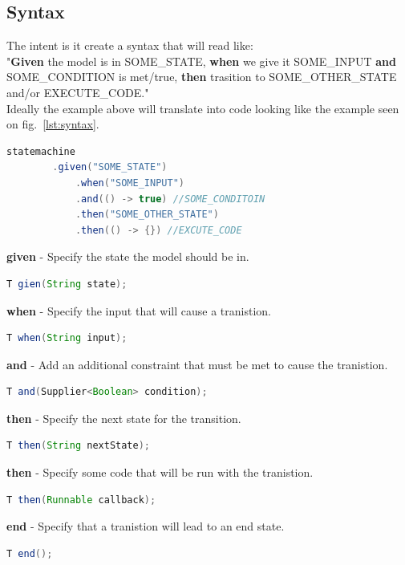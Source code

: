 \documentclass{article}
\begin{document}
\subsection{Syntax}

The intent is it create a syntax that will read like:\\
"\textbf{Given} the model is in SOME\_STATE, \textbf{when} we give it SOME\_INPUT \textbf{and} SOME\_CONDITION is met/true, \textbf{then} trasition to SOME\_OTHER\_STATE  and/or EXECUTE\_CODE."\\

\noindent Ideally the example above will translate into code looking like the example seen on fig.~\ref{lst:syntax}.
\begin{lstlisting}[language=java, caption={Example of Intented API Usage}, captionpos=b, label={lst:syntax}]
    statemachine
        .given("SOME_STATE")
            .when("SOME_INPUT")
            .and(() -> true) //SOME_CONDITOIN
            .then("SOME_OTHER_STATE")
            .then(() -> {}) //EXCUTE_CODE
\end{lstlisting}

\textbf{given} - Specify the state the model should be in.
\begin{lstlisting}[language=java]
    T gien(String state);
\end{lstlisting}

\textbf{when} - Specify the input that will cause a tranistion.
\begin{lstlisting}[language=java]
    T when(String input);
\end{lstlisting}

\textbf{and} - Add an additional constraint that must be met to cause the tranistion.
\begin{lstlisting}[language=java]
    T and(Supplier<Boolean> condition);
\end{lstlisting}

\textbf{then} - Specify the next state for the transition.
\begin{lstlisting}[language=java]
    T then(String nextState);
\end{lstlisting}

\textbf{then} - Specify some code that will be run with the tranistion.
\begin{lstlisting}[language=java]
    T then(Runnable callback);
\end{lstlisting}

\textbf{end} - Specify that a tranistion will lead to an end state.
\begin{lstlisting}[language=java]
    T end();
\end{lstlisting}
\end{document}
